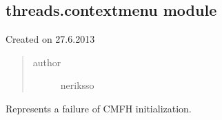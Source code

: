 \documentclass[letterpaper,10pt,english]{sphinxmanual}
\begin{document}
\subsection{threads.contextmenu module}
\label{threads:module-threads.contextmenu}\label{threads:threads-contextmenu-module}
Created on 27.6.2013
\begin{quote}\begin{description}
\item[{author}] \leavevmode
neriksso

\end{description}\end{quote}

\begin{fulllineitems}
\label{threads:threads.contextmenu.ContextMenuFailure}
Represents a failure of CMFH initialization.

\end{fulllineitems}

\end{document}
